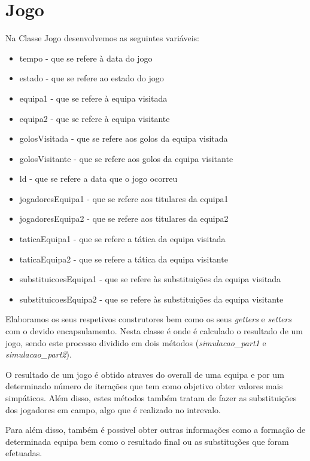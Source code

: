 \documentclass[a4paper,12pt]{article}
\begin{document}
\section{Jogo}
    Na Classe Jogo desenvolvemos as seguintes variáveis:
    \begin{itemize}
        \item tempo - que se refere à data do jogo
        \item estado - que se refere ao estado do jogo
        \item equipa1 - que se refere à equipa visitada
        \item equipa2 - que se refere à equipa visitante
        \item golosVisitada - que se refere aos golos da equipa visitada
        \item golosVisitante - que se refere aos golos da equipa visitante
        \item ld - que se refere a data que o jogo ocorreu
        \item jogadoresEquipa1 - que se refere aos titulares da equipa1
        \item jogadoresEquipa2 - que se refere aos titulares da equipa2
        \item taticaEquipa1 - que se refere a tática da equipa visitada
        \item taticaEquipa2 - que se refere a tática da equipa visitante
        \item substituicoesEquipa1 - que se refere às substituições da equipa visitada
        \item substituicoesEquipa2 - que se refere às substituições da equipa visitante
    \end{itemize} \par
    Elaboramos os seus respetivos construtores bem como os seus \emph{getters} e \emph{setters} com o devido encapsulamento.
    Nesta classe é onde é calculado o resultado de um jogo, sendo este processo dividido em dois métodos
(\emph{simulacao\_part1} e \emph{simulacao\_part2}).\par
    O resultado de um jogo é obtido atraves do overall de uma equipa e por um determinado número de iterações que tem
como objetivo obter valores mais simpáticos. Além disso, estes métodos também tratam de fazer as substituições dos
jogadores em campo, algo que é realizado no intrevalo. \par
    Para além disso, também é possivel obter outras informações como a formação de determinada equipa bem como o resultado
final ou as substituções que foram efetuadas.
\end{document}
